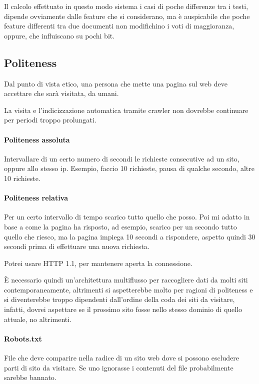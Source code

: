 Il calcolo effettuato in questo modo sistema i casi di poche differenze tra i testi, 
dipende ovviamente dalle feature che si considerano, ma è auspicabile che poche 
feature differenti tra due documenti non modifichino i voti di maggioranza, oppure, che influiscano su pochi bit. 

\subsection{Politeness}

Dal punto di vista etico, una persona che mette una pagina sul web 
deve accettare che sarà visitata, da umani. 

La visita e l'indicizzazione automatica tramite crawler non dovrebbe 
continuare per periodi troppo prolungati.

\paragraph{Politeness assoluta}
Intervallare di un certo numero di secondi le richieste consecutive ad 
un sito, oppure allo stesso ip. Esempio, faccio 10 richieste, pausa di qualche secondo, altre 10 richieste.

\paragraph{Politeness relativa}
Per un certo intervallo di tempo scarico tutto quello che posso. Poi mi 
adatto in base a come la pagina ha risposto, ad esempio, 
scarico per un secondo tutto quello che riesco, ma la pagina impiega 
10 secondi a rispondere, aspetto quindi 30 secondi prima di effettuare 
una nuova richiesta.

Potrei usare HTTP 1.1, per mantenere aperta la connessione. 

\begin{remark}
    È necessario quindi un'architettura multiflusso per raccogliere dati 
    da molti siti contemporaneamente, altrimenti si aspetterebbe molto 
    per ragioni di politeness e si diventerebbe troppo dipendenti 
    dall'ordine della coda dei siti da visitare, infatti, dovrei aspettare 
    se il prossimo sito fosse nello stesso dominio di quello attuale, no altrimenti.
\end{remark}

\paragraph{Robots.txt}
File che deve comparire nella radice di un sito web dove si possono 
escludere parti di sito da visitare.
Se uno ignorasse i contenuti del file probabilmente sarebbe bannato. 

